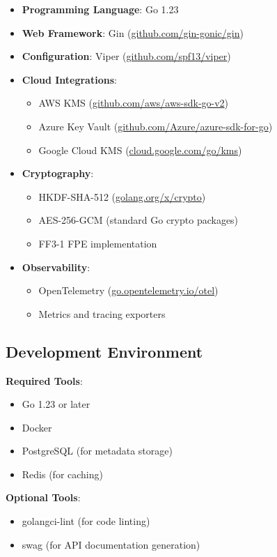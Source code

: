 \documentclass[12pt]{article}
\begin{document}
\begin{itemize}
    \item \textbf{Programming Language}: Go 1.23
    \item \textbf{Web Framework}: Gin (\url{github.com/gin-gonic/gin})
    \item \textbf{Configuration}: Viper (\url{github.com/spf13/viper})
    \item \textbf{Cloud Integrations}:
    \begin{itemize}
        \item AWS KMS (\url{github.com/aws/aws-sdk-go-v2})
        \item Azure Key Vault (\url{github.com/Azure/azure-sdk-for-go})
        \item Google Cloud KMS (\url{cloud.google.com/go/kms})
    \end{itemize}
    \item \textbf{Cryptography}:
    \begin{itemize}
        \item HKDF-SHA-512 (\url{golang.org/x/crypto})
        \item AES-256-GCM (standard Go crypto packages)
        \item FF3-1 FPE implementation
    \end{itemize}
    \item \textbf{Observability}:
    \begin{itemize}
        \item OpenTelemetry (\url{go.opentelemetry.io/otel})
        \item Metrics and tracing exporters
    \end{itemize}
\end{itemize}

\subsection{Development Environment}

\textbf{Required Tools}:
\begin{itemize}
    \item Go 1.23 or later
    \item Docker
    \item PostgreSQL (for metadata storage)
    \item Redis (for caching)
\end{itemize}

\textbf{Optional Tools}:
\begin{itemize}
    \item golangci-lint (for code linting)
    \item swag (for API documentation generation)
\end{itemize}
\end{document}
